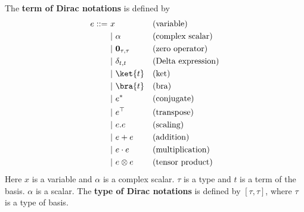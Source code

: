 \begin{definition}
  The \textbf{term of Dirac notations} is defined by
  \begin{align*}
    e ::= \ 
      &    x                          && \text{(variable)} \\
      & |\ \alpha                     && \text{(complex scalar)}   \\
      & |\ \mathbf{0}_{\tau, \tau}    && \text{(zero operator)}\\
      & |\ \delta_{t, t}              && \text{(Delta expression)} \\
      & |\ \ket{t}                    && \text{(ket)} \\
      & |\ \bra{t}                    && \text{(bra)} \\
      & |\ e^*                        && \text{(conjugate)} \\
      & |\ e^\top                     && \text{(transpose)} \\
      & |\ e.e                        && \text{(scaling)} \\
      & |\ e + e                      && \text{(addition)} \\
      & |\ e \cdot e                  && \text{(multiplication)} \\
      & |\ e \otimes e                && \text{(tensor product)}
  \end{align*}
  Here $x$ is a variable and $\alpha$ is a complex scalar. $\tau$ is a type and $t$ is a term of the basis. $\alpha$ is a scalar. 
  The \textbf{type of Dirac notations} is defined by $[\tau, \tau]$, where $\tau$ is a type of basis.
\end{definition}


